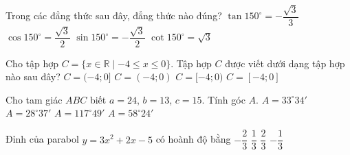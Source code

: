 \begin{ex}%
	Trong các đẳng thức sau đây, đẳng thức nào đúng?
	\choice
	{\True $\tan 150^{\circ}=-\dfrac{\sqrt{3}}{3}$}
	{$\cos 150^{\circ}=\dfrac{\sqrt{3}}{2}$}
	{$\sin 150^{\circ}=-\dfrac{\sqrt{3}}{2}$}
	{$\cot 150^{\circ}=\sqrt{3}$}
\end{ex}
\begin{ex}%
	Cho tập hợp $C=\{x \in \mathbb{R} \mid -4 \leq x \leq 0\}$. Tập hợp $C$ được viết dưới dạng tập hợp nào sau đây?
	\choice
	{$C=(-4;0]$}
	{$C=(-4;0)$}
	{$C=[-4;0)$}
	{\True $C=[-4;0]$}
\end{ex}
\begin{ex}%
	Cho tam giác $ABC$ biết $a=24$, $b=13$, $c=15$. Tính góc $A$.
	\choice
	{$A=33^{\circ} 34'$}
	{$A=28^{\circ} 37'$}
	{\True $A=117^{\circ} 49'$}
	{$A=58^{\circ} 24'$}
\end{ex}
\begin{ex}%
	Đỉnh của parabol $y=3x^2+2x-5$ có hoành độ bằng
	\choice
	{$-\dfrac{2}{3}$}
	{$\dfrac{1}{3}$}
	{$\dfrac{2}{3}$}
	{\True $-\dfrac{1}{3}$}
\end{ex}
